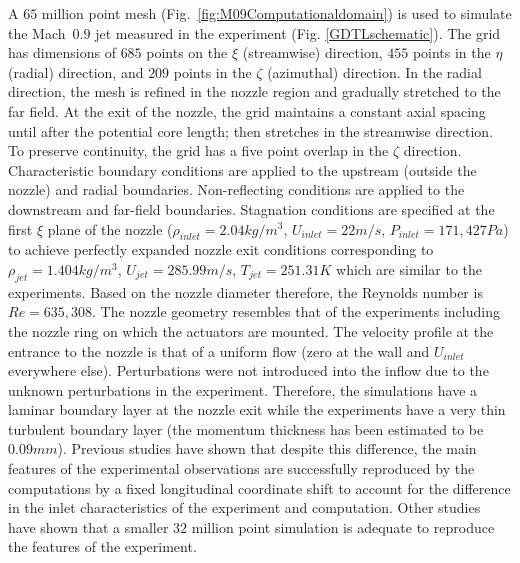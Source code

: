 \documentclass[english]{aiaa-tc}
\begin{document}
 A $65$ million point mesh (Fig.~\ref{fig:M09Computationaldomain}) is
 used to simulate the Mach~$0.9$ jet measured in the experiment (Fig.
 \ref{GDTLschematic}).  The grid has dimensions of $685$ points on the
 $\xi$ (streamwise) direction, $455$ points in the $\eta$ (radial)
 direction, and $209$ points in the $\zeta$ (azimuthal) direction. In
 the radial direction, the mesh is refined in the nozzle region and
 gradually stretched to the far field. At the exit of the nozzle, the
 grid maintains a constant axial spacing until after the potential
 core length; then stretches in the streamwise direction. To
 preserve continuity, the grid has a five point overlap in the $\zeta$
 direction. Characteristic boundary conditions\cite{bj2000-1} are
 applied to the upstream (outside the nozzle) and radial boundaries.
 Non-reflecting conditions are applied to the downstream and far-field
 boundaries. Stagnation conditions are specified at the first $\xi$
 plane of the nozzle ($\rho_{inlet}=2.04kg/m^{3}$, $U_{inlet}=22m/s$, $P_{inlet}=171,427Pa$) to
 achieve perfectly expanded nozzle exit conditions corresponding to
 $\rho_{jet}=1.404kg/m^{3}$, $U_{jet}=285.99m/s$, $T_{jet}=251.31K$ which are similar to the experiments.
 Based on the nozzle diameter therefore, the Reynolds number is
 $Re=635,308$. The nozzle geometry resembles that of the
 experiments including the nozzle ring on which the actuators are
 mounted.
 The velocity profile at the entrance to the nozzle is that
 of a uniform flow (zero at the wall and $U_{inlet}$ everywhere else).
 Perturbations were not introduced into the inflow due to the
 unknown perturbations in the experiment. Therefore, the simulations
 have a laminar boundary layer at the nozzle exit while the
 experiments have a very thin turbulent boundary layer (the momentum
 thickness has been estimated to be $0.09 mm$).  Previous studies have
 shown that despite this difference, the main features of the
 experimental observations are successfully reproduced by the
 computations by a fixed longitudinal coordinate shift to account
 for the difference in the inlet characteristics of the experiment and computation\cite{gdv2011-POF,SpethCF2013}.  Other studies have shown
 that a smaller $32$ million point simulation is adequate to reproduce
 the features of the experiment\cite{spethASME2013}.
\end{document}

